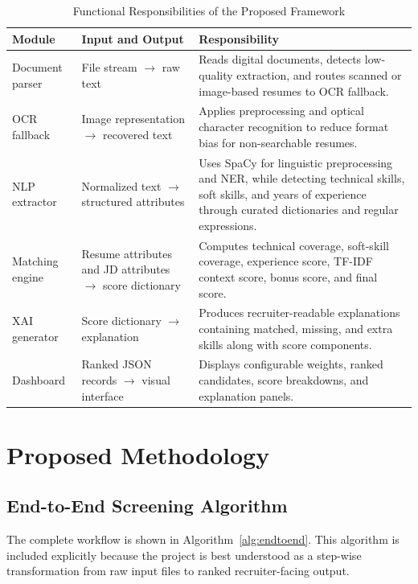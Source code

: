 \documentclass[conference]{IEEEtran}
\newcounter{algorithm}
\begin{document}
\begin{table}[t]
\centering
\caption{Functional Responsibilities of the Proposed Framework}
\label{tab:modules}
\small
\begin{tabularx}{\textwidth}{p{}p{}Y}
\toprule
\textbf{Module} & \textbf{Input and Output} & \textbf{Responsibility}\\
\midrule
Document parser & File stream \(\rightarrow\) raw text & Reads digital documents, detects low-quality extraction, and routes scanned or image-based resumes to OCR fallback.\\
OCR fallback & Image representation \(\rightarrow\) recovered text & Applies preprocessing and optical character recognition to reduce format bias for non-searchable resumes.\\
NLP extractor & Normalized text \(\rightarrow\) structured attributes & Uses SpaCy for linguistic preprocessing and NER, while detecting technical skills, soft skills, and years of experience through curated dictionaries and regular expressions.\\
Matching engine & Resume attributes and JD attributes \(\rightarrow\) score dictionary & Computes technical coverage, soft-skill coverage, experience score, TF-IDF context score, bonus score, and final score.\\
XAI generator & Score dictionary \(\rightarrow\) explanation & Produces recruiter-readable explanations containing matched, missing, and extra skills along with score components.\\
Dashboard & Ranked JSON records \(\rightarrow\) visual interface & Displays configurable weights, ranked candidates, score breakdowns, and explanation panels.\\
\bottomrule
\end{tabularx}
\end{table}

\section{Proposed Methodology}
\subsection{End-to-End Screening Algorithm}
The complete workflow is shown in Algorithm~\ref{alg:endtoend}. This algorithm is included explicitly because the project is best understood as a step-wise transformation from raw input files to ranked recruiter-facing output.
\end{document}
